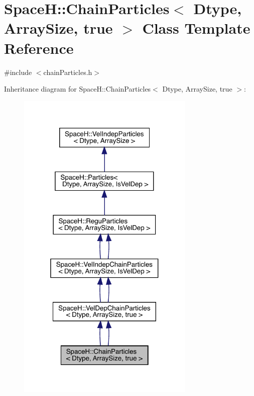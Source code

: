 \hypertarget{class_space_h_1_1_chain_particles_3_01_dtype_00_01_array_size_00_01true_01_4}{}\section{SpaceH\+:\+:Chain\+Particles$<$ Dtype, Array\+Size, true $>$ Class Template Reference}
\label{class_space_h_1_1_chain_particles_3_01_dtype_00_01_array_size_00_01true_01_4}


{\ttfamily \#include $<$chain\+Particles.\+h$>$}



Inheritance diagram for SpaceH\+:\+:Chain\+Particles$<$ Dtype, Array\+Size, true $>$\+:
\nopagebreak
\begin{figure}[H]
\begin{center}
\leavevmode
\includegraphics[width=241pt]{class_space_h_1_1_chain_particles_3_01_dtype_00_01_array_size_00_01true_01_4__inherit__graph}
\end{center}
\end{figure}


